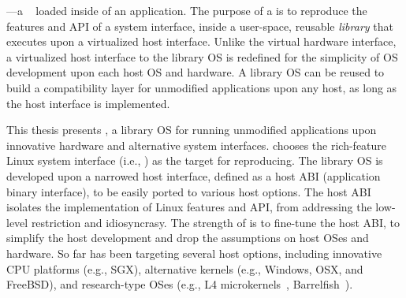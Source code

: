 ---a {\bf \libos{}}~\cite{porter11drawbridge,engler95exokernel,libra,unikernels}
loaded inside of an application.
The purpose of a \libos{} is to
reproduce the features and API of a system interface,
inside a user-space, reusable {\em library} that executes upon a virtualized host interface.
Unlike the virtual hardware interface,
a virtualized host interface to the library OS is redefined for the simplicity
of OS development upon each host OS and hardware.
A library OS can be reused to build a compatibility layer for unmodified applications upon any host,
as long as the host interface is implemented.


This thesis presents
{\bf \graphene{}},
a library OS for running unmodified applications upon innovative hardware and alternative system interfaces.
\graphene{} chooses the rich-feature Linux system interface (i.e., \linuxapis{})
as the target for reproducing.
The \graphene{} library OS
is developed upon a narrowed host interface, defined as a host ABI (application binary interface),
to be easily ported to various host options.
The host ABI isolates the implementation of Linux features and API, from addressing the low-level restriction and idiosyncrasy.
The strength of \graphene{} is to fine-tune the host ABI,
to simplify the host development and drop the assumptions on host OSes and hardware.
So far \graphene{}
has been targeting several host options,
including innovative CPU platforms (e.g., SGX), alternative kernels (e.g., Windows, OSX, and FreeBSD), and research-type OSes (e.g., L4 microkernels~\cite{l4family}, Barrelfish~\cite{baumann09barrelfish}).



